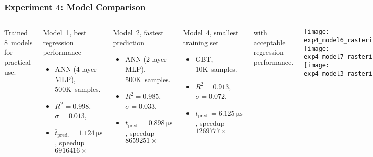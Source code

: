 \begin{frame}
	\frametitle{Experiment 4: Model Comparison}
	\begin{columns}
		Trained \alert{8~models} for practical use.

		\begin{block}{\footnotesize Model~1, best regression performance}
			\footnotesize
			\linespread{0.6}\selectfont
			\begin{itemize}
				\setlength\itemsep{0em}
				\item
					ANN (4-layer MLP), 500K~samples.
				\item
					$R^2=\num{0.998}$,
					$\sigma=\num{0.013}$,
				\item
					$\overline{t}_{\text{pred.}}=\SI{1.124}{\micro\second}$,
					\alert{speedup $\num{6916416} \times$}
			\end{itemize}
		\end{block}
		\vspace{-0.6em}
		\begin{block}{\footnotesize Model~2, fastest prediction\textsuperscript{\textdagger}}
			\footnotesize
			\linespread{0.6}\selectfont
			\begin{itemize}
				\setlength\itemsep{0em}
				\item
					ANN (2-layer MLP), 500K~samples.
				\item
					$R^2=\num{0.985}$,
					$\sigma=\num{0.033}$,
				\item
					$\overline{t}_{\text{pred.}}=\SI{0.898}{\micro\second}$,
					\alert{speedup $\num{8659251} \times$}
			\end{itemize}
		\end{block}
		\vspace{-0.6em}
		\begin{block}{\footnotesize Model~4, smallest training set\textsuperscript{\textdagger}}
			\footnotesize
			\linespread{0.6}\selectfont
			\begin{itemize}
				\setlength\itemsep{0em}
				\item
					GBT, \alert{10K~samples.}
				\item
					$R^2=\num{0.913}$,
					$\sigma=\num{0.072}$,
				\item
					$\overline{t}_{\text{pred.}}=\SI{6.125}{\micro\second}$,
					\alert{speedup $\num{1269777} \times$}
			\end{itemize}
		\end{block}
		\vspace{-0.6em}
		{\tiny
			\textsuperscript{\textdagger}
			with acceptable regression performance.
		}

		\texttt{[image: exp4\_model6\_rasterized]}\vspace{-8pt}\\
		\texttt{[image: exp4\_model7\_rasterized]}\vspace{-8pt}\\
		\texttt{[image: exp4\_model3\_rasterized]}
	\end{columns}
\end{frame}
